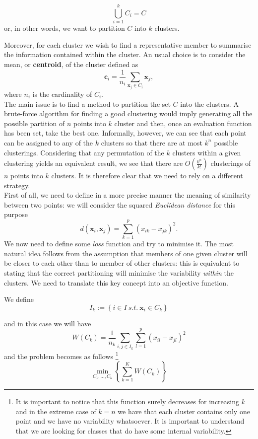 \documentclass[a4paper]{article}
\begin{document}
	$$
	\bigcup_{i=1}^{k} C_{i} = C
	$$
	or, in other words, we want to partition $C$ into $k$ clusters.
	
	Moreover, for each cluster we wish to find a representative member to summarise the information contained within the cluster. An usual choice is to consider the mean, or \textbf{centroid}, of the cluster defined as
	\begin{equation*}
	\boldsymbol{c}_{i} = \frac{1}{n_{i}} \sum_{\boldsymbol{x}_{j} \in C_{i}} \boldsymbol{x}_{j},
	\end{equation*}
	where $n_{i}$ is the cardinality of $C_{i}$.\\
	
	The main issue is to find a method to partition the set $C$ into
	the clusters. A brute-force algorithm for finding a good clustering would imply generating all the possible partition of $n$ points into $k$ cluster and then, once an evaluation function has been set, take the best one. Informally, however, we can see that each point can be assigned to any of the $k$ clusters so that there are at most $k^{n}$ possible clusterings. Considering that any permutation of the $k$ clusters within a given clustering yields an equivalent result, we see that there are $O(\frac{k^{n}}{k!})$ clusterings of $n$ points into $k$ clusters. It is therefore clear that we need to rely on a different strategy.\\
	
	
	First of all, we need to define in a more precise manner
	the meaning of similarity between two points: we will consider the squared \textsl{Euclidean
		distance} for this purpose
	$$
	d(\boldsymbol{x}_{i},\boldsymbol{x}_{j})= \sum_{k = 1}^{p} \left( x_{ik} - x_{jk}
	\right)^{2}.
	$$
	We now need to define some \textsl{loss} function and try to minimise
	it. The most natural idea follows from the assumption that members
	of one given cluster will be closer to each other than to member of
	other clusters: this is equivalent to stating that the correct partitioning
	will minimise the variability \textsl{within} the clusters. We need
	to translate this key concept into an objective function.
	
	We define
	$$
	I_{k}:=\left\{ i\in I\:s.t.\:\boldsymbol{x}_{i}\in C_{k}\right\} 
	$$
	
	and in this case we will have
	$$
	W(C_{k}) = \frac{1}{n_{k}} \underset{i,j\in I_{k}}{\sum} \sum_{l=1}^{p} \left(x_{il}-x_{jl}\right)^{2}
	$$
	and the problem becomes as follows
	\footnote{It is important to notice that this function surely decreases for
		increasing $k$ and in the extreme case of $k=n$ we have that each
		cluster contains only one point and we have no variability whatsoever.
		It is important to understand that we are looking for classes that
		do have some internal variability.}
	$$	\underset{C_{1},\ldots,C_{k}}{\min}\left\{ \sum_{k=1}^{K}W(C_{k})\right\} $$
	
\end{document}
